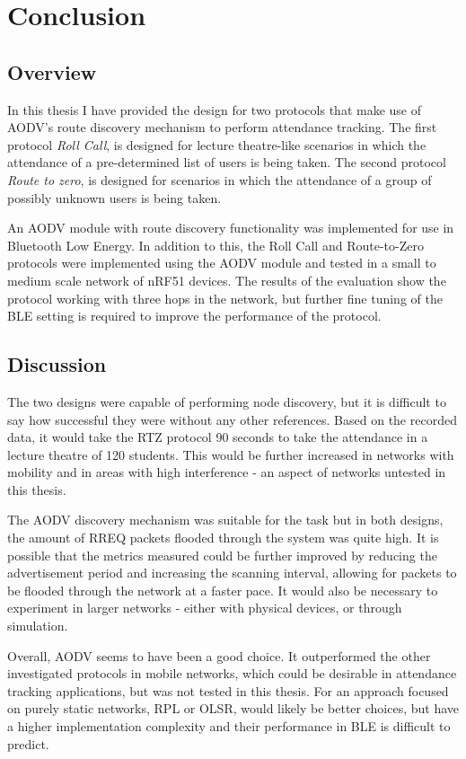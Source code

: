 \chapter{Conclusion}

  \section{Overview}
  In this thesis I have provided the design for two protocols that make use
  of AODV's route discovery mechanism to perform attendance tracking. The first
  protocol \textit{Roll Call}, is designed for lecture theatre-like scenarios in
  which the attendance of a pre-determined list of users is being taken. The
  second protocol \textit{Route to zero}, is designed for scenarios in which
  the attendance of a group of possibly unknown users is being taken.

  An AODV module with route discovery functionality was implemented for use in
  Bluetooth Low Energy. In addition to this, the Roll Call and Route-to-Zero protocols were implemented
  using the AODV module and tested in a small to medium scale network of nRF51
  devices. The results of the evaluation show the protocol working with three
  hops in the network, but further fine tuning of the BLE setting is required
  to improve the performance of the protocol.

  \section{Discussion}
  The two designs were capable of performing node discovery, but it is difficult
  to say how successful they were without any other references. Based on the recorded
  data, it would take the RTZ protocol 90 seconds to take the attendance in a lecture
  theatre of 120 students. This would be further increased in networks with mobility
  and in areas with high interference - an aspect of networks untested in this thesis.

  The AODV discovery mechanism was suitable for the task but in both designs, the amount
  of RREQ packets flooded through the system was quite high.
  It is possible that the metrics measured could be further improved by reducing
  the advertisement period and increasing the scanning interval, allowing for
  packets to be flooded through the network at a faster pace. It would also be necessary
  to experiment in larger networks - either with physical devices, or through
  simulation.

  Overall, AODV seems to have been a good choice. It outperformed the other
  investigated protocols in mobile networks, which could be desirable in attendance
  tracking applications, but was not tested in this thesis. For an approach
  focused on purely static networks, RPL or OLSR, would likely be better choices,
  but have a higher implementation complexity and their performance in BLE is
  difficult to predict.

